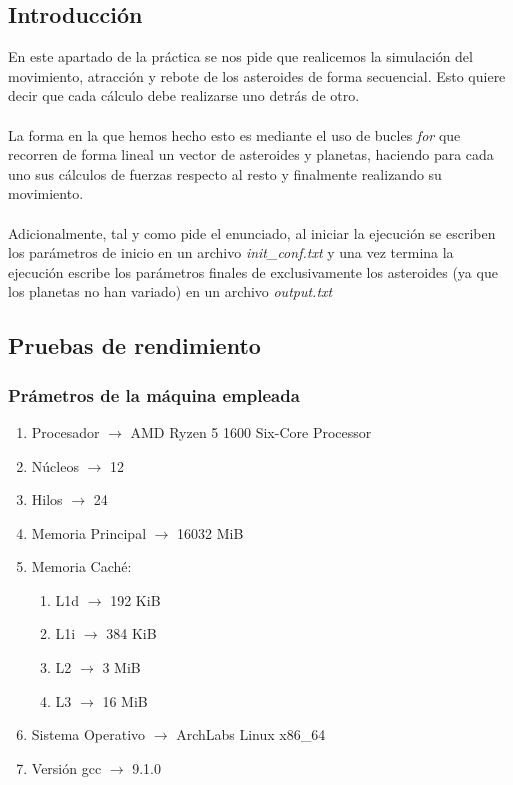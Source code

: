 \documentclass[12pt]{article}
\begin{document}
        \subsection{Introducción}
        \noindent En este apartado de la práctica se nos pide que realicemos la simulación del movimiento, atracción y rebote de los asteroides de forma secuencial. Esto quiere decir que cada cálculo debe realizarse uno detrás de otro. \\ \\
        La forma en la que hemos hecho esto es mediante el uso de bucles \textit{for} que recorren de forma lineal un vector de asteroides y planetas, haciendo para cada uno sus cálculos de fuerzas respecto al resto y finalmente realizando su movimiento.\\ \\
        Adicionalmente, tal y como pide el enunciado, al iniciar la ejecución se escriben los parámetros de inicio en un archivo \textit{init\_conf.txt} y una vez termina la ejecución escribe los parámetros finales de exclusivamente los asteroides (ya que los planetas no han variado) en un archivo \textit{output.txt}
        \noindent 
        \subsection{Pruebas de rendimiento}
        \subsubsection{Prámetros de la máquina empleada}
            \begin{enumerate}
                \item Procesador $\rightarrow$ AMD Ryzen 5 1600 Six-Core Processor
                \item Núcleos $\rightarrow$ 12
                \item Hilos $\rightarrow$ 24
                \item Memoria Principal $\rightarrow$ 16032 MiB
                \item Memoria Caché:
                    \begin{enumerate}
                        \item L1d $\rightarrow$ 192 KiB
                        \item L1i $\rightarrow$ 384 KiB
                        \item L2 $\rightarrow$ 3 MiB
                        \item L3 $\rightarrow$ 16 MiB
                    \end{enumerate}
                \item Sistema Operativo $\rightarrow$ ArchLabs Linux x86\_64
                \item Versión gcc $\rightarrow$ 9.1.0
            \end{enumerate}
        \newpage
\end{document}
